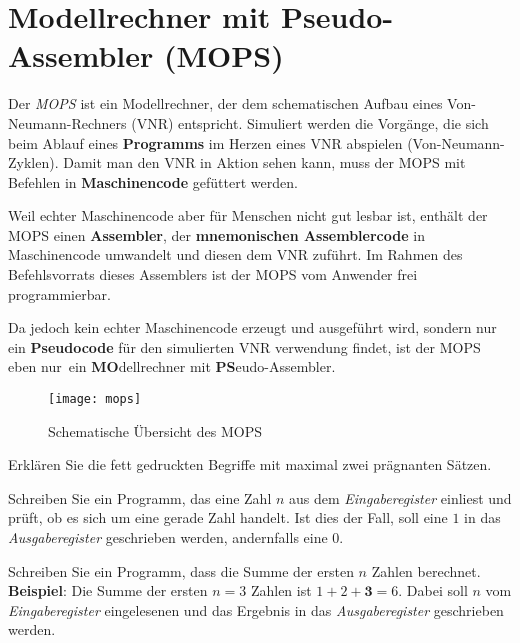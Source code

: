 \documentclass[loesung]{schulein}
\begin{document}
 
\section*{Modellrechner mit Pseudo-Assembler (MOPS)}
Der \textit{MOPS} ist ein Modellrechner, der dem schematischen Aufbau eines Von-Neumann-Rechners (VNR) entspricht. 
Simuliert werden die Vorgänge, die sich beim Ablauf eines \textbf{Programms} im Herzen eines VNR abspielen (\glqq Von-Neumann-Zyklen\grqq ). Damit man den VNR in Aktion sehen kann, muss der MOPS mit Befehlen in \textbf{Maschinencode} gefüttert werden. 

Weil echter Maschinencode aber für Menschen nicht gut lesbar ist, enthält der MOPS einen \textbf{Assembler}, der \textbf{mnemonischen Assemblercode} in Maschinencode umwandelt und diesen dem VNR zuführt. Im Rahmen des Befehlsvorrats dieses Assemblers ist der MOPS vom Anwender frei programmierbar. 

Da jedoch kein echter Maschinencode erzeugt und ausgeführt wird, sondern nur ein \textbf{Pseudocode} für den simulierten VNR verwendung findet, ist der MOPS eben \glqq nur\grqq\ ein \textbf{MO}dellrechner mit \textbf{PS}eudo-Assembler. 
\begin{figure}[hbtp]
\centering
\texttt{[image: mops]}
\caption{Schematische Übersicht des MOPS}
\end{figure}
\vspace*{-2cm}
%
\begin{aufgaben}
\item \leicht Erklären Sie die fett gedruckten Begriffe mit maximal zwei prägnanten Sätzen.
\item \mittel Schreiben Sie ein Programm, das eine Zahl $n$ aus dem \textit{Eingaberegister} einliest und prüft, ob es sich um eine gerade Zahl handelt. Ist dies der Fall, soll eine $1$ in das \textit{Ausgaberegister} geschrieben werden, andernfalls eine $0$.
\item \schwer Schreiben Sie ein Programm, dass die Summe der ersten $n$ Zahlen berechnet. \textbf{Beispiel}: Die Summe der ersten $n=3$ Zahlen ist $1+2+\textbf{3}=6$. Dabei soll $n$ vom \textit{Eingaberegister} eingelesenen und das Ergebnis in das \textit{Ausgaberegister} geschrieben werden.
\end{aufgaben}
%
\newpage
{}
\end{document}
